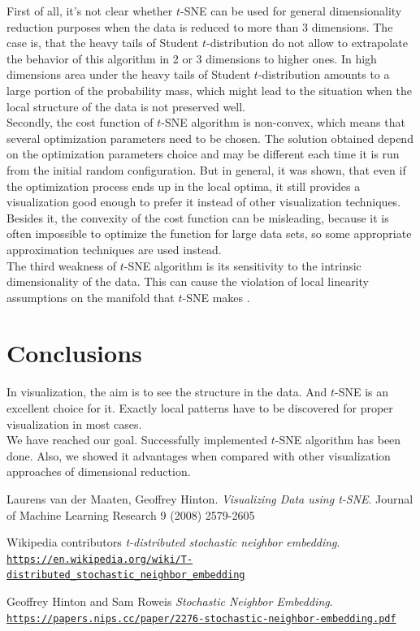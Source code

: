 First of all, it's not clear whether $t$-SNE can be used for general dimensionality reduction purposes when the data is reduced to more than 3 dimensions. The case is, that the heavy tails of Student $t$-distribution do not allow to extrapolate the behavior of this algorithm in 2 or 3 dimensions to higher ones. In high dimensions area under the heavy tails of Student $t$-distribution amounts to a large portion of the probability mass, which might lead to the situation when the local structure of the data is not preserved well. \\

Secondly, the cost function of $t$-SNE algorithm is non-convex, which means that several optimization parameters need to be chosen. The solution obtained depend on the optimization parameters choice and may be different each time it is run from the initial random configuration. But in general, it was shown, that even if the optimization process ends up in the local optima, it still provides a visualization good enough to prefer it instead of other visualization techniques. Besides it, the convexity of the cost function can be misleading, because it is often impossible to optimize the function for large data sets, so some appropriate approximation techniques are used instead. \\

The third weakness of $t$-SNE algorithm is its sensitivity to the intrinsic dimensionality of the data. This can cause the violation of local linearity assumptions on the manifold that $t$-SNE makes \cite{tsnearticle}.\\

\section{Conclusions}

In visualization, the aim is to see the structure in the data. And $t$-SNE is an excellent choice for it. Exactly local patterns have to be discovered for proper visualization in most cases.\\
We have reached our goal. Successfully implemented $t$-SNE algorithm has been done. Also, we showed it advantages when compared with other visualization approaches of dimensional reduction.

\begin{thebibliography}{4}
	Laurens van der Maaten, Geoffrey Hinton.
	\textit{Visualizing Data using t-SNE}. 
	Journal of Machine Learning Research 9 (2008) 2579-2605
	
	Wikipedia contributors
	\textit{t-distributed stochastic neighbor embedding}.\\
	\texttt{\url{https://en.wikipedia.org/wiki/T-distributed\_stochastic\_neighbor\_embedding}}
	
	Geoffrey Hinton and Sam Roweis
	\textit{Stochastic Neighbor Embedding}.\\
	\texttt{\url{https://papers.nips.cc/paper/2276-stochastic-neighbor-embedding.pdf}}
	
	
\end{thebibliography}



